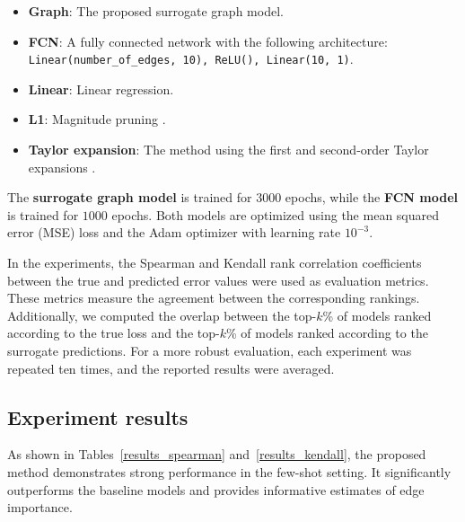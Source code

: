 \documentclass[runningheads]{llncs}
\begin{document}
\begin{itemize}
\item \textbf{Graph}:
The proposed surrogate graph model.

\item \textbf{FCN}:
A fully connected network with the following architecture:\\
\texttt{Linear(number\_of\_edges, 10), ReLU(), Linear(10, 1)}.

\item\textbf{Linear}:
Linear regression.

\item\textbf{L1}:
Magnitude pruning \cite{Han2015}.

\item\textbf{Taylor expansion}:
The method using the first and second-order Taylor expansions \cite{Molchanov2019}.
\end{itemize}

The \textbf{surrogate graph model} is trained for $3000$ epochs, while the \textbf{FCN model} is trained for $1000$ epochs. 
Both models are optimized using the mean squared error (MSE) loss and the Adam optimizer with learning rate $10^{-3}$.

In the experiments, the Spearman and Kendall rank correlation coefficients between the true and predicted error values were used as evaluation metrics.
These metrics measure the agreement between the corresponding rankings.
Additionally, we computed the overlap between the top-$k$\% of models ranked according to the true loss and the top-$k$\% of models ranked according to the surrogate predictions.
For a more robust evaluation, each experiment was repeated ten times, and the reported results were averaged.

\subsection{Experiment results}

As shown in Tables~\ref{results_spearman} and~\ref{results_kendall}, the proposed method demonstrates strong performance in the few-shot setting. 
It significantly outperforms the baseline models and provides informative estimates of edge importance.
\end{document}
